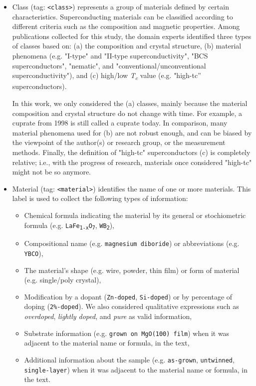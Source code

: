 \documentclass[]{interact}
\theoremstyle{plain}%
\theoremstyle{definition}
\theoremstyle{remark}
\begin{document}
\begin{itemize}
\item Class (tag: \texttt{<class>}) represents a group of materials defined by certain characteristics.
Superconducting materials can be classified according to different criteria such as the composition and magnetic properties. 
Among publications collected for this study, the domain experts identified three types of classes based on: (a) the composition and crystal structure, (b) material phenomena (e.g. "I-type" and "II-type superconductivity", "BCS superconductors", "nematic", and "conventional/unconventional superconductivity"), and (c) high/low \textit{T\textsubscript{c}} value (e.g. "high-tc” superconductors). 

In this work, we only considered the (a) classes, mainly because the material composition and crystal structure do not change with time. For example, a cuprate from 1998 is still called a cuprate today. 
In comparison, many material phenomena used for (b) are not robust enough, and can be biased by the viewpoint of the author(s) or research group, or the measurement methods. 
Finally, the definition of "high-tc" superconductors (c) is completely relative; i.e., with the progress of research, materials once considered "high-tc" might not be so anymore.

\item Material (tag: \texttt{<material>}) identifies the name of one or more materials. 
This label is used to collect the following types of information: 
\begin{itemize}
    \item Chemical formula indicating the material by its general or stochiometric formula (e.g. \texttt{LaFe\textsubscript{1-x}O\textsubscript{7}}, \texttt{WB\textsubscript{2}}),
    \item Compositional name (e.g. \texttt{magnesium diboride}) or abbreviations (e.g. \texttt{YBCO}), 
    \item The material's shape (e.g. wire, powder, thin film) or form of material (e.g. single/poly crystal), 
    \item Modification by a dopant (\texttt{Zn-doped}, \texttt{Si-doped}) or by percentage of doping (\texttt{2\%-doped}). We also considered qualitative expressions such as \textit{overdoped}, \textit{lightly doped}, and \textit{pure} as valid information, 
    \item Substrate information (e.g. \texttt{grown on MgO(100) film}) when it was adjacent to the material name or formula, in the text,
    \item Additional information about the sample (e.g. \texttt{as-grown}, \texttt{untwinned}, \texttt{single-layer}) when it was adjacent to the material name or formula, in the text. 
\end{itemize}


\end{itemize}
\end{document}
